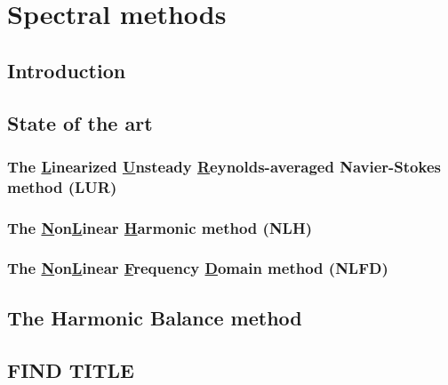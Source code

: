 \chapter{Spectral methods}
\label{cha:spectral_methods}

\chabstract{}

\section{Introduction}
\label{sec:sm_intro}


\section{State of the art}
\label{sec:sm_state_of_the_art}


\subsection{The \underline{L}inearized 
\underline{U}nsteady \underline{R}eynolds-averaged Navier-Stokes method (LUR)}
\label{sub:sm_lur}


\subsection{The \underline{N}on\underline{L}inear 
\underline{H}armonic method (NLH)}
\label{sub:sm_nlh}


\subsection{The \underline{N}on\underline{L}inear 
\underline{F}requency \underline{D}omain method (NLFD)}
\label{sub:sm_nlfd}


\section{The Harmonic Balance method}
\label{sec:sm_hb}


\section{FIND TITLE}
\label{sec:sm_summary}

